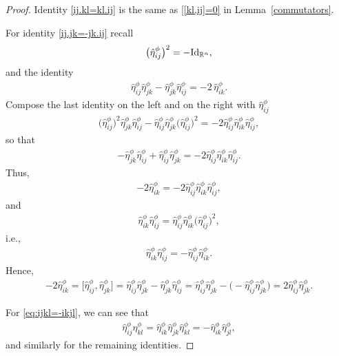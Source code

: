 \documentclass[10pt,a4paper]{amsart}
\numberwithin{equation}{section}
\begin{document}
\begin{proof} Identity \eqref{ij.kl=kl.ij} is the same as \eqref{[kl,ij]=0} in Lemma~\ref{commutators}.

For identity \eqref{ij.jk=-jk.ij} recall
\begin{gather*}\big(\hat\eta_{ij}^\phi\big)^2 = - {\rm Id}_{\mathbb{R}^n},\end{gather*}
and the identity
\begin{gather*}\hat\eta_{ij}^\phi\hat\eta_{jk}^\phi -\hat\eta_{jk}^\phi\hat\eta_{ij}^\phi= -2\,\hat\eta_{ik}^\phi.\end{gather*}
Compose the last identity on the left and on the right with $\hat\eta_{ij}^\phi$
\begin{gather*}\big(\hat\eta_{ij}^\phi\big)^2\hat\eta_{jk}^\phi\hat\eta_{ij}^\phi
-\hat\eta_{ij}^\phi\hat\eta_{jk}^\phi\big(\hat\eta_{ij}^\phi\big)^2=
-2 \hat\eta_{ij}^\phi\hat\eta_{ik}^\phi\hat\eta_{ij}^\phi,\end{gather*}
so that
\begin{gather*}-\hat\eta_{jk}^\phi\hat\eta_{ij}^\phi +\hat\eta_{ij}^\phi\hat\eta_{jk}^\phi=
-2 \hat\eta_{ij}^\phi\hat\eta_{ik}^\phi\hat\eta_{ij}^\phi.\end{gather*}
Thus,
\begin{gather*}-2\hat\eta_{ik}^\phi= -2 \hat\eta_{ij}^\phi\hat\eta_{ik}^\phi\hat\eta_{ij}^\phi,\end{gather*}
and
\begin{gather*}\hat\eta_{ik}^\phi\hat\eta_{ij}^\phi= \hat\eta_{ij}^\phi\hat\eta_{ik}^\phi\big(\hat\eta_{ij}^\phi\big)^2,\end{gather*}
i.e.,
\begin{gather*}\hat\eta_{ik}^\phi\hat\eta_{ij}^\phi= -\hat\eta_{ij}^\phi\hat\eta_{ik}^\phi.\end{gather*}
Hence,
\begin{gather*}
-2 \hat\eta_{ik}^\phi
 = \big[\hat\eta_{ij}^\phi,\hat\eta_{jk}^\phi\big]
 = \hat\eta_{ij}^\phi\hat\eta_{jk}^\phi -\hat\eta_{jk}^\phi\hat\eta_{ij}^\phi
 = \hat\eta_{ij}^\phi\hat\eta_{jk}^\phi -\big({-}\hat\eta_{ij}^\phi\hat\eta_{jk}^\phi\big)
 = 2\hat\eta_{ij}^\phi\hat\eta_{jk}^\phi.
\end{gather*}

For \eqref{eq:ijkl=-ikjl}, we can see that
\begin{gather*}
 \hat\eta_{ij}^\phi\hat\eta_{kl}^\phi = \hat\eta_{ik}^\phi\hat\eta_{jk}^\phi \hat\eta_{kl}^\phi = -\hat\eta_{ik}^\phi\hat\eta_{jl}^\phi,
\end{gather*}
and similarly for the remaining identities.
\end{proof}
\end{document}
